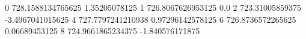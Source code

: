 0 728.1588134765625 1.35205078125
1 726.8067626953125 0.0
2 723.31005859375 -3.4967041015625
4 727.7797241210938 0.97296142578125
6 726.8736572265625 0.06689453125
8 724.9661865234375 -1.840576171875
